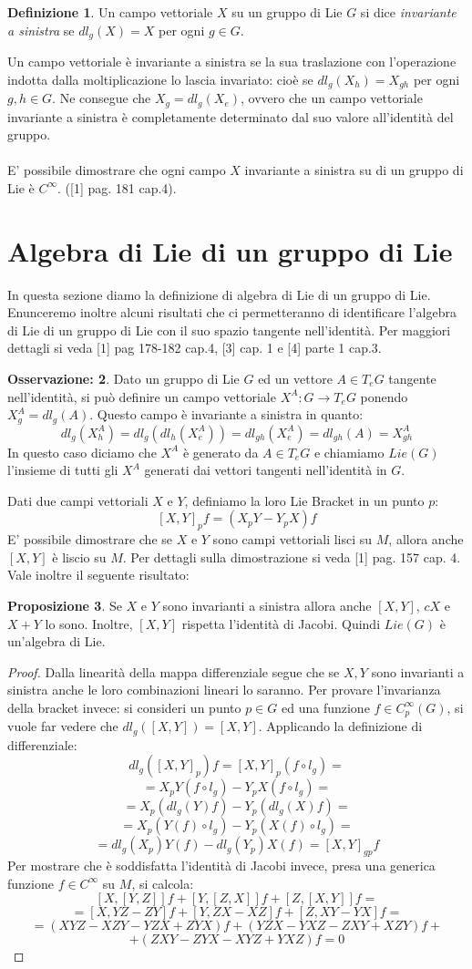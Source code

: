 \documentclass[12pt,a4paper]{report}
\theoremstyle{definition}
\newtheorem{Def}{Definizione}[chapter]
\theoremstyle{Theorem}
\newtheorem{Prop}[Def]{Proposizione}
\theoremstyle{definition}
\theoremstyle{definition}
\theoremstyle{definition}
\newtheorem{Obs}[Def]{Osservazione:}
\begin{document}
\begin{Def}
	Un campo vettoriale $X$ su un gruppo di Lie $G$ si dice \textit{invariante a sinistra} se $dl_g(X)=X$ per ogni $g\in G$.
\end{Def}
Un campo vettoriale è invariante a sinistra se la sua traslazione con l'operazione indotta dalla moltiplicazione lo lascia invariato: cioè se $dl_g(X_h)=X_{gh}$ per ogni $g,h\in G$.
Ne consegue che $X_g=dl_g(X_e)$, ovvero che un campo vettoriale invariante a sinistra è completamente determinato dal suo valore all'identità del gruppo.\\
\\
E' possibile dimostrare che ogni campo $X$ invariante a sinistra su di un gruppo di Lie è $C^\infty$. ([1] pag. 181 cap.4).
\section{Algebra di Lie di un gruppo di Lie}
In questa sezione diamo la definizione di algebra di Lie di un gruppo di Lie. Enunceremo inoltre alcuni risultati che ci permetteranno di identificare l'algebra di Lie di un gruppo di Lie con il suo spazio tangente nell'identità. Per maggiori dettagli si veda [1] pag 178-182 cap.4, [3] cap. 1 e [4] parte 1 cap.3.
\begin{Obs} \label{Obs: 2.2}
	Dato un gruppo di Lie $G$ ed un vettore $A\in T_eG$ tangente nell'identità, si può definire un campo vettoriale $X^A:G\rightarrow T_eG$ ponendo $X^A_g=dl_g(A)$. Questo campo è invariante a sinistra in quanto: $$dl_g(X^A_h)=dl_g(dl_h(X^A_e))=dl_{gh}(X^A_e)=dl_{gh}(A)=X^A_{gh}$$
	In questo caso diciamo che $X^A$ è generato da $A\in T_eG$ e chiamiamo $Lie(G)$ l'insieme di tutti gli $X^A$ generati dai vettori tangenti nell'identità in $G$.	
\end{Obs}
Dati due campi vettoriali $X$ e $Y$, definiamo la loro Lie Bracket in un punto $p$:
 $$[X,Y]_pf=(X_pY-Y_pX)f$$
E' possibile dimostrare che se $X$ e $Y$ sono campi vettoriali lisci su $M$, allora anche $[X,Y]$ è liscio su $M$. Per dettagli sulla dimostrazione si veda [1] pag. 157 cap. 4.
Vale inoltre il seguente risultato:
\begin{Prop}
	Se $X$ e $Y$ sono invarianti a sinistra allora anche $[X,Y]$, $cX$ e $X+Y$ lo sono. Inoltre, $[X,Y]$ rispetta l'identità di Jacobi. Quindi $Lie(G)$ è un'algebra di Lie.
\end{Prop}
\begin{proof}
	Dalla linearità della mappa differenziale segue che se $X,Y$ sono invarianti a sinistra anche le loro combinazioni lineari lo saranno.
	Per provare l'invarianza della bracket invece: si consideri un punto $p\in G$ ed una funzione $f\in C^\infty_p(G)$, si vuole far vedere che $dl_g([X,Y])=[X,Y]$.
	Applicando la definizione di differenziale: $$dl_g([X,Y]_p)f=[X,Y]_p(f\circ l_g)=$$$$=X_pY(f\circ l_g)-Y_pX(f\circ l_g)=$$$$=X_p(dl_g(Y)f)-Y_p(dl_g(X)f)=$$
	$$=X_p(Y(f)\circ l_g)-Y_p(X(f)\circ l_g)=$$
	$$=dl_g(X_p)Y(f)-dl_g(Y_p)X(f)=[X,Y]_{gp}f$$ 
	Per mostrare che è soddisfatta l'identità di Jacobi invece, presa una generica funzione $f\in C^\infty$ su $M$, si calcola:
	$$[X,[Y,Z]]f+[Y,[Z,X]]f+[Z,[X,Y]]f=$$
	$$=[X,YZ-ZY]f+[Y,ZX-XZ]f+[Z,XY-YX]f=$$
	$$=(XYZ-XZY-YZX+ZYX)f+(YZX-YXZ-ZXY+XZY)f+$$$$+(ZXY-ZYX-XYZ+YXZ)f=0$$
\end{proof}
\end{document}
